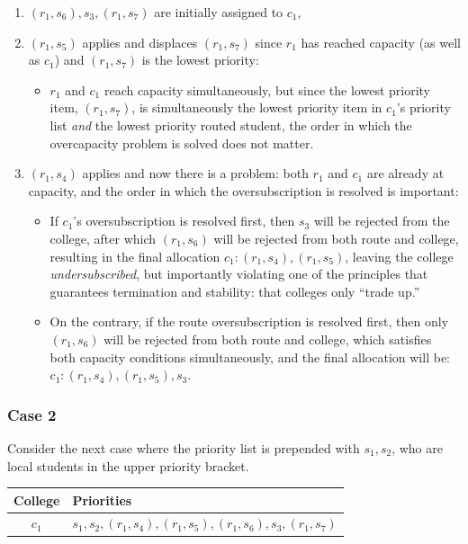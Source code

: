 \documentclass{article}
\begin{document}
\begin{enumerate}
    \item $(r_1,s_6),s_3,(r_1,s_7)$ are initially assigned to $c_1$,
    \item $(r_1,s_5)$ applies and displaces $(r_1,s_7)$ since $r_1$ has reached capacity (as well as $c_1$) and $(r_1,s_7)$ is the lowest priority:
    \begin{itemize}
        \item $r_1$ and $c_1$ reach capacity simultaneously, but since the lowest priority item, $(r_1,s_7)$, is simultaneously the lowest priority item in $c_1$'s priority list \textit{and} the lowest priority routed student, the order in which the overcapacity problem is solved does not matter.
    \end{itemize}
    \item $(r_1,s_4)$ applies and now there is a problem: both $r_1$ and $c_1$ are already at capacity, and the order in which the oversubscription is resolved is important:
    \begin{itemize}
        \item If $c_1$'s oversubscription is resolved first, then $s_3$ will be rejected from the college, after which $(r_1,s_6)$ will be rejected from both route and college, resulting in the final allocation $c_1:(r_1,s_4),(r_1,s_5)$, leaving the college \textit{undersubscribed}, but importantly violating one of the principles that guarantees termination and stability: that colleges only \enquote{trade up.}
        \item On the contrary, if the route oversubscription is resolved first, then only $(r_1,s_6)$ will be rejected from both route and college, which satisfies both capacity conditions simultaneously, and the final allocation will be: $c_1:(r_1,s_4),(r_1,s_5),s_3$.
    \end{itemize}
\end{enumerate}

\subsubsection{Case 2}
Consider the next case where the priority list is prepended with $s_1,s_2$, who are local students in the upper priority bracket.

\begin{center}
    \begin{tabular}{ c|l }
        College&Priorities \\
        \hline
        $c_1$&$s_1,s_2,(r_1,s_4),(r_1,s_5),(r_1,s_6),s_3,(r_1,s_7)$ \\
\end{tabular}
\end{center}
\end{document}
